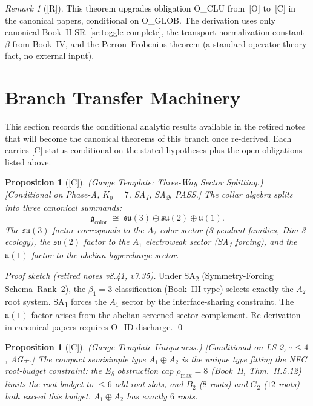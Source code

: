 \documentclass[12pt,oneside]{amsbook}
\theoremstyle{plain}
\newtheorem{proposition}[theorem]{Proposition}
\theoremstyle{definition}
\theoremstyle{remark}
\newtheorem{remark}[theorem]{Remark}
\newcommand{\status}[1]{\textup{[#1]}}
\begin{document}
\begin{remark}[\status{R}]
This theorem upgrades obligation O\_CLU from~[O] to~[C] in the
canonical papers, conditional on O\_GLOB. The derivation uses only
canonical Book~II SR~\ref{sr:toggle-complete}, the transport
normalization constant $\beta$ from Book~IV, and the Perron--Frobenius
theorem (a standard operator-theory fact, no external input).
\end{remark}

\section{Branch Transfer Machinery}
\label{sec:transfer}

This section records the conditional analytic results available
in the retired notes that will become the canonical theorems of
this branch once re-derived. Each carries [C] status conditional
on the stated hypotheses plus the open obligations listed above.

\begin{proposition}[\status{C}]\label{prop:YM-profile}
\textup{(Gauge Template: Three-Way Sector Splitting.)}
\textup{[Conditional on Phase-A, $K_0=7$, SA\textsubscript{1},
SA\textsubscript{2}, PASS.]}
The collar algebra splits into three canonical summands:
\[
 \mathfrak{g}_{\mathrm{color}}
 \;\cong\;
 \mathfrak{su}(3) \oplus \mathfrak{su}(2) \oplus \mathfrak{u}(1).
\]
The $\mathfrak{su}(3)$ factor corresponds to the $A_2$ color sector
(3 pendant families, Dim-3 ecology), the $\mathfrak{su}(2)$ factor
to the $A_1$ electroweak sector (SA\textsubscript{1} forcing),
and the $\mathfrak{u}(1)$ factor to the abelian hypercharge sector.
\end{proposition}

\begin{proof}[Proof sketch (retired notes v8.41, v7.35)]
Under SA\textsubscript{2} (Symmetry-Forcing Schema~Rank~2), the
$\beta_1 = 3$ classification (Book~III type) selects exactly the
$A_2$ root system. SA\textsubscript{1} forces the $A_1$ sector by
the interface-sharing constraint. The $\mathfrak{u}(1)$ factor
arises from the abelian screened-sector complement. Re-derivation
in canonical papers requires O\_ID discharge.
\qed
\end{proof}

\begin{proposition}[\status{C}]\label{prop:YM-gauge-unique}
\textup{(Gauge Template Uniqueness.)}
\textup{[Conditional on LS-2, $\tau \leq 4$, AG+.]}
The compact semisimple type $A_1 \oplus A_2$ is the unique type
fitting the NFC root-budget constraint: the E\textsubscript{8}
obstruction cap $\rho_{\max} = 8$ (Book~II, Thm.~II.5.12) limits
the root budget to $\leq 6$ odd-root slots, and $B_2$ ($8$ roots)
and $G_2$ ($12$ roots) both exceed this budget. $A_1 \oplus A_2$
has exactly $6$ roots.
\end{proposition}
\end{document}
